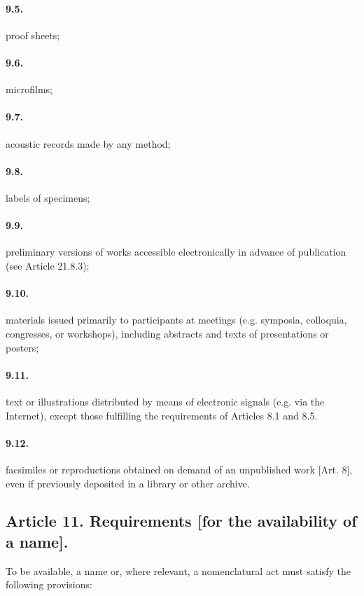 \paragraph*{9.5.} proof sheets;

\paragraph*{9.6.} microfilms;

\paragraph*{9.7.} acoustic records made by any method;

\paragraph*{9.8.} labels of specimens;

\paragraph*{9.9.} preliminary versions of works accessible electronically in advance of publication (see Article
21.8.3);

\paragraph*{9.10.} materials issued primarily to participants at meetings (e.g. symposia, colloquia, congresses, or workshops), including abstracts and texts of presentations or posters;

\paragraph*{9.11.} text or illustrations distributed by means of electronic signals (e.g. via the Internet), except those fulfilling the requirements of Articles 8.1 and 8.5.

\paragraph*{9.12.} facsimiles or reproductions obtained on demand of an unpublished work [Art. 8], even if previously deposited in a library or other archive.

\subsection*{Article 11. Requirements [for the availability of a name].}
To be available, a name or, where relevant, a nomenclatural act must satisfy the following provisions:

